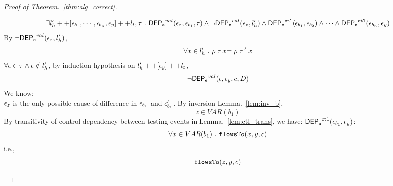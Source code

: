 \documentclass[a4paper,11pt]{article}
\begin{document}
\begin{proof}[Proof of Theorem.~\ref{thm:alg_correct}]
\begin{case}
\begin{subcase}
\[
  \exists l_{h}' ++ [ \mathtt{\epsilon}_{b_1}, \cdots, \mathtt{\epsilon}_{b_n}, \mathtt{\epsilon}_y] ++ l_t, \mathtt{\tau} ~.~
  \mathsf{DEP_{\mathtt{e}}}^{val}(\mathtt{\epsilon}_z, \mathtt{\epsilon}_{b_1}, \mathtt{\tau})
  \land 
  \neg \mathsf{DEP_{\mathtt{e}}}^{val} (\mathtt{\epsilon}_z, l_h')
  \land 
  \mathsf{DEP_{\mathtt{e}}}^{\mathtt{{ctl}}} (\mathtt{\epsilon}_{b_1}, \mathtt{\epsilon}_{b_2})
  \land 
  \cdots
  \land 
  \mathsf{DEP_{\mathtt{e}}}^{\mathtt{{ctl}}} (\mathtt{\epsilon}_{b_n}, \mathtt{\epsilon}_y)
\]
%
By $\neg \mathsf{DEP_{\mathtt{e}}}^{val} (\mathtt{\epsilon}_z, l_h')$, 
\[
  \forall x \in l_h' ~.~
  \rho \mathrel{ {\mathtt{\tau}} \, {x} } = \rho \mathrel{ {\mathtt{\tau}} \, {'} } x
\]
%
$\forall \mathtt{\epsilon} \in \mathtt{\tau} \land \mathtt{\epsilon} \notin l_h'$, by induction hypothesis on $l_{h}' ++ [\mathtt{\epsilon}_y] ++ l_t$, 
\[
  \neg \mathsf{DEP_{\mathtt{e}}}^{val} (\mathtt{\epsilon}, \mathtt{\epsilon}_y, c, D)
\]
%
We know:
\\
%
$\mathtt{\epsilon}_z$ is the only possible cause of difference in $\mathtt{\epsilon}_{b_1}$ and $\mathtt{\epsilon}_{b_1}'$.
%
By inversion Lemma.~\ref{lem:inv_b}, 
\[
  z \in VAR(b_1)
\]
%
%
By transitivity of control dependency between testing events in Lemma.~\ref{lem:ctl_trans},
we have:
 $ \mathsf{DEP_{\mathtt{e}}}^{\mathtt{{ctl}}} (\mathtt{\epsilon}_{b_1}, \mathtt{\epsilon}_y)$:
\[
  \forall x \in VAR(b_1) ~.~ \mathtt{flowsTo}(x, y, c)
\]
i.e.,
\[
  \mathtt{flowsTo}(z, y, c)
\]
%
\end{subcase}
%
\end{case}
%
\end{proof}
\end{document}
